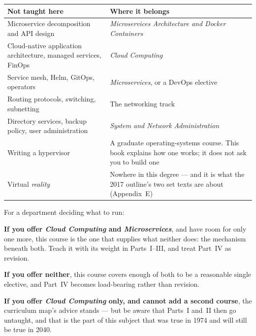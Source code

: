 \begin{longtable}{@{}L{5.0cm}L{9.8cm}@{}}
\toprule
{}
\textbf{Not taught here} & \textbf{Where it belongs} \\
\midrule
\endhead
Microservice decomposition and API design & \emph{Microservices Architecture
and Docker Containers} \\
Cloud-native application architecture, managed services, FinOps &
\emph{Cloud Computing} \\
Service mesh, Helm, GitOps, operators & \emph{Microservices}, or a DevOps
elective \\
Routing protocols, switching, subnetting & The networking track \\
Directory services, backup policy, user administration & \emph{System and
Network Administration} \\
Writing a hypervisor & A graduate operating-systems course. This book explains
how one works; it does not ask you to build one \\
Virtual \emph{reality} & Nowhere in this degree --- and it is what the 2017
outline's two set texts are about (Appendix~E) \\
\bottomrule
\end{longtable}

\begin{conceptbox}
For a department deciding what to run:

\smallskip
\textbf{If you offer \emph{Cloud Computing} and \emph{Microservices}}, and have
room for only one more, this course is the one that supplies what neither does:
the mechanism beneath both. Teach it with its weight in Parts~I--III, and treat
Part~IV as revision.

\smallskip
\textbf{If you offer neither}, this course covers enough of both to be a
reasonable single elective, and Part~IV becomes load-bearing rather than
revision.

\smallskip
\textbf{If you offer \emph{Cloud Computing} only, and cannot add a second
course}, the curriculum map's advice stands --- but be aware that Parts~I
and~II then go untaught, and that is the part of this subject that was true in
1974 and will still be true in 2040.
\end{conceptbox}
